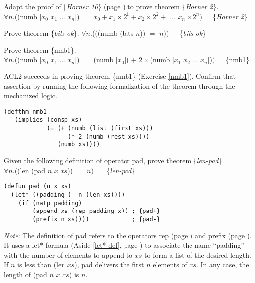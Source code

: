 \begin{ExerciseList}

\Exercise \label{horner2-thm}
Adapt the proof of \{\emph{Horner 10}\} (page \pageref{horner10-thm}) to prove theorem
\{\emph{Horner 2}\}.\\
\hspace*{16mm}$\forall n.($\textsf{(numb [$x_0$ $x_1$ $\dots$ $x_{n}$])}
$=$ $x_0 + x_1 \times 2^1 + x_2 \times 2^2 +$ $\dots$ $x_{n} \times 2^{n})$~~~\{\emph{Horner 2}\}

\Exercise \label{bits-ok}
Prove theorem
\{\emph{bits ok}\}.
$\forall n.$(\textsf{((numb (bits $n$)) $=$ $n$)}$)$~~~\{\emph{bits ok}\}

\Exercise \label{nmb1}
Prove theorem
\{nmb1\}.\\
\hspace*{16mm}$\forall n.($\textsf{(numb [$x_0$ $x_1$ $\dots$ $x_{n}$])}
$=$ \textsf{(numb [$x_0$]) $+$ $2\times$(numb [$x_1$ $x_2$ $\dots$ $x_{n}$])}$)$~~~\{nmb1\}

\Exercise \label{nmb1-acl2}
ACL2 succeeds in proving theorem \{nmb1\} (Exercise \ref{nmb1}).
Confirm that assertion by running the following
formalization of the theorem through the mechanized logic.
\begin{Verbatim}
(defthm nmb1
   (implies (consp xs)
            (= (+ (numb (list (first xs)))
                  (* 2 (numb (rest xs))))
               (numb xs))))
\end{Verbatim}

\Exercise\label{ex:pad-defun}
Given the following definition of operator \textsf{pad}, prove theorem \{\emph{len-pad}\}.\\
\hspace*{16mm}$\forall n.($\textsf{(len (pad $n$ $x$ $xs$))} $=$ $n)$~~~ \{\emph{len-pad}\}
\begin{samepage}
\label{pad-defun}
\begin{Verbatim}
(defun pad (n x xs)
  (let* ((padding (- n (len xs))))
    (if (natp padding)
        (append xs (rep padding x)) ; {pad+}
        (prefix n xs))))            ; {pad-}
\end{Verbatim}
\end{samepage}
\emph{Note}: The definition of \textsf{pad} refers to the operators
\textsf{rep} (page \pageref{rep-equations}) and \textsf{prefix} (page \pageref{prefix-equations}).
It uses a \textsf{let$*$} formula (Aside \ref{let*-def}, page \pageref{let*-def})
to associate the name ``\textsf{padding}'' with the number of elements to append to $xs$
to form a list of the desired length. If $n$ is less than \textsf{(len $xs$)},
\textsf{pad} delivers the first $n$ elements of $xs$. In any case, the length of
\textsf{(pad $n$ $x$ $xs$)} is $n$.


\end{ExerciseList}
